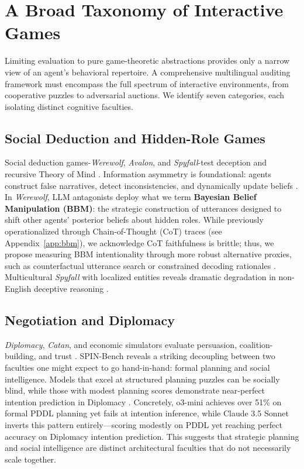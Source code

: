 \documentclass[11pt]{article}
\begin{document}
\section{A Broad Taxonomy of Interactive Games}
\label{sec:taxonomy}

Limiting evaluation to pure game-theoretic abstractions provides only a narrow view of an agent's behavioral repertoire. A comprehensive multilingual auditing framework must encompass the full spectrum of interactive environments, from cooperative puzzles to adversarial auctions. We identify seven categories, each isolating distinct cognitive faculties.

\subsection{Social Deduction and Hidden-Role Games}
\label{sec:social_deduction}

Social deduction games-\textit{Werewolf}, \textit{Avalon}, and \textit{Spyfall}-test deception and recursive Theory of Mind \citep{xu2023werewolf, koto2025spyfall}. Information asymmetry is foundational: agents construct false narratives, detect inconsistencies, and dynamically update beliefs \citep{deweerd2013bayesiantom}. In \textit{Werewolf}, LLM antagonists deploy what we term \textbf{Bayesian Belief Manipulation (BBM)}: the strategic construction of utterances designed to shift other agents' posterior beliefs about hidden roles. While previously operationalized through Chain-of-Thought (CoT) traces (see Appendix~\ref{app:bbm}), we acknowledge CoT faithfulness is brittle; thus, we propose measuring BBM intentionality through more robust alternative proxies, such as counterfactual utterance search or constrained decoding rationales \citep{xu2023werewolf, wang2023avalon, lan2024avalon}. Multicultural \textit{Spyfall} with localized entities reveals dramatic degradation in non-English deceptive reasoning \citep{koto2025spyfall}.

\subsection{Negotiation and Diplomacy}
\label{sec:negotiation}

\textit{Diplomacy}, \textit{Catan}, and economic simulators evaluate persuasion, coalition-building, and trust \citep{meta2022cicero, deng2024bargaining}. SPIN-Bench reveals a striking decoupling between two faculties one might expect to go hand-in-hand: formal planning and social intelligence. Models that excel at structured planning puzzles can be socially blind, while those with modest planning scores demonstrate near-perfect intention prediction in Diplomacy \citep{yao2025spinbench}. Concretely, o3-mini achieves over 51\% on formal PDDL planning yet fails at intention inference, while Claude 3.5 Sonnet inverts this pattern entirely---scoring modestly on PDDL yet reaching perfect accuracy on Diplomacy intention prediction. This suggests that strategic planning and social intelligence are distinct architectural faculties that do not necessarily scale together.
\end{document}
